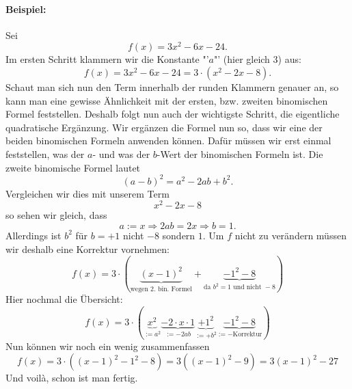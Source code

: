 \paragraph{Beispiel:}
Sei 
\begin{equation*}
f(x) = 3x^2 - 6x - 24.
\end{equation*}
Im ersten Schritt klammern wir die Konstante "'$a$"' (hier gleich $3$) aus:
\begin{equation*}
f(x) = 3x^2 - 6x - 24= 3 \cdot (x^2-2x-8).
\end{equation*}
Schaut man sich nun den Term innerhalb der runden Klammern genauer an, so kann man eine gewisse Ähnlichkeit mit der ersten, bzw. zweiten binomischen Formel feststellen. Deshalb folgt nun auch der wichtigste Schritt, die eigentliche quadratische Ergänzung. Wir ergänzen die Formel nun so, dass wir eine der beiden binomischen Formeln anwenden können. Dafür müssen wir erst einmal feststellen, was der $a$- und was der $b$-Wert der binomischen Formeln ist. Die zweite binomische Formel lautet 
\begin{equation*}
(a-b)^2=a^2-2ab+b^2.
\end{equation*}
Vergleichen wir dies mit unserem Term 
\begin{equation*}
x^2-2x-8
\end{equation*}
so sehen wir gleich, dass
\begin{equation*}
a := x \Rightarrow 2ab = 2x \Rightarrow b = 1.
\end{equation*}
Allerdings ist $b^2$ für $b = +1$ nicht $-8$ sondern $1$. Um $f$ nicht zu verändern müssen wir deshalb eine Korrektur vornehmen:
\begin{equation*}
f(x) = 3 \cdot \left(  \underbrace{(x-1)^2}_{\text{wegen 2. bin. Formel}} + \underbrace{-1^2 - 8}_{\text{da } b^2 = 1 \text{ und nicht } -8 } \right)
\end{equation*}
Hier nochmal die Übersicht:
\begin{equation*}
f(x) = 3 \cdot \left(  \underbrace{x^2}_{:=a^2} \underbrace{- 2 \cdot x \cdot 1}_{:= -2ab} \underbrace{+ 1^2}_{:= + b^2} \underbrace{- 1^2 -8}_{:=-\text{Korrektur}} \right)
\end{equation*} 
Nun können wir noch ein wenig zusammenfassen
\begin{equation*}
f(x) = 3 \cdot ((x-1)^2-1^2-8) = 3((x-1)^2-9) = 3(x-1)^2-27
\end{equation*}
Und voil\`a, schon ist man fertig.

